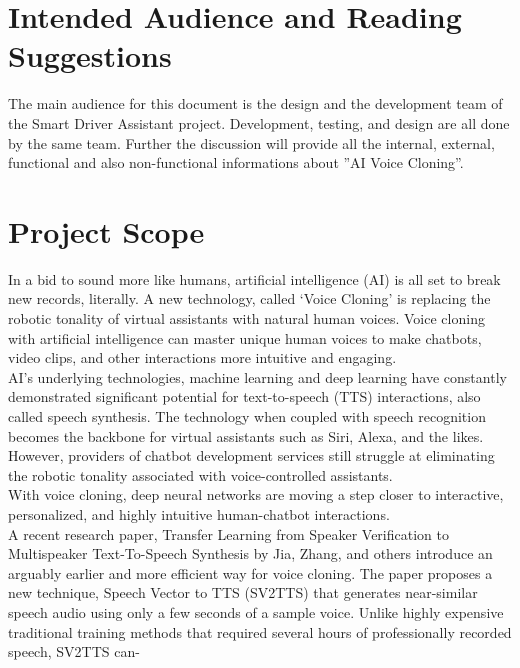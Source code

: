 \documentclass[12pt]{report}
\begin{document}
\section{Intended Audience and Reading Suggestions}
The main audience for this document is the design and the development team of the Smart Driver
Assistant project. Development, testing, and design are all done by the
same team. Further the discussion
will provide all the internal, external, functional and also non-functional informations
about ”AI Voice Cloning”. 

\section{Project Scope}

In a bid to sound more like humans, artificial intelligence (AI) is all set to break new records, literally. A new technology, called ‘Voice Cloning’ is replacing the robotic tonality of virtual assistants with natural human voices. Voice cloning with artificial intelligence can master unique human voices to make chatbots, video clips, and other interactions more intuitive and engaging.\\ 

AI’s underlying technologies, machine learning and deep learning have constantly demonstrated significant potential for text-to-speech (TTS) interactions, also called speech synthesis. The technology when coupled with speech recognition becomes the backbone for virtual assistants such as Siri, Alexa, and the likes. However, providers of chatbot development services still struggle at eliminating the robotic tonality associated with voice-controlled assistants.\\

With voice cloning, deep neural networks are moving a step closer to interactive, personalized, and highly intuitive human-chatbot interactions.\\

A recent research paper, Transfer Learning from Speaker Verification to Multispeaker Text-To-Speech Synthesis by Jia, Zhang, and others introduce an arguably earlier and more efficient way for voice cloning. The paper proposes a new technique, Speech Vector to TTS (SV2TTS) that generates near-similar speech audio using only a few seconds of a sample voice. Unlike highly expensive traditional training methods that required several hours of professionally recorded speech, SV2TTS can-\\
\end{document}
